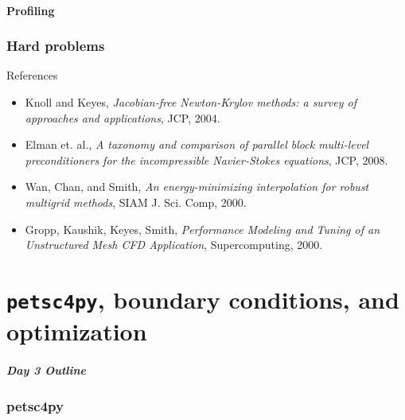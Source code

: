 \documentclass{beamer}
\begin{document}
\subsection{Profiling}






\section{Hard problems}





\begin{frame}{References}
  \begin{itemize}
  \item Knoll and Keyes, \emph{Jacobian-free Newton-Krylov methods: a survey of approaches and applications}, JCP, 2004.
  \item Elman et. al., \emph{A taxonomy and comparison of parallel block multi-level preconditioners for the incompressible Navier-Stokes equations}, JCP, 2008.
  \item Wan, Chan, and Smith, \emph{An energy-minimizing interpolation for robust multigrid methods}, SIAM J. Sci. Comp, 2000.
  \item Gropp, Kaushik, Keyes, Smith, \emph{Performance Modeling and Tuning of an Unstructured Mesh CFD Application}, Supercomputing, 2000.
  \end{itemize}
\end{frame}

\part{\texttt{petsc4py}, boundary conditions, and optimization}
\begin{frame}
\frametitle{Day 3 Outline}
\tableofcontents
\end{frame}

\section{petsc4py}



\end{document}
